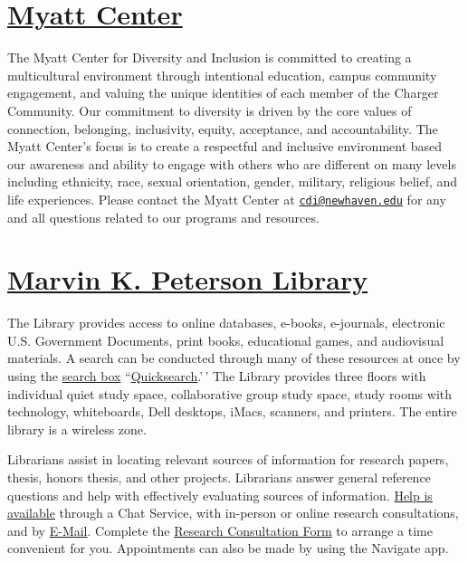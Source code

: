\documentclass[11pt,]{article}
\begin{document}
\hypertarget{myatt-center}{%
\section{\texorpdfstring{\href{https://mycharger.newhaven.edu/web/mycharger/center-for-diversity-and-inclusion}{Myatt
Center}}{Myatt Center}}\label{myatt-center}}

The Myatt Center for Diversity and Inclusion is committed to creating a
multicultural environment through intentional education, campus
community engagement, and valuing the unique identities of each member
of the Charger Community. Our commitment to diversity is driven by the
core values of connection, belonging, inclusivity, equity, acceptance,
and accountability. The Myatt Center's focus is to create a respectful
and inclusive environment based our awareness and ability to engage with
others who are different on many levels including ethnicity, race,
sexual orientation, gender, military, religious belief, and life
experiences. Please contact the Myatt Center at
\href{mailto:cdi@newhaven.edu}{\nolinkurl{cdi@newhaven.edu}} for any and
all questions related to our programs and resources.

\hypertarget{marvin-k.-peterson-library}{%
\section{\texorpdfstring{\href{https://mycharger.newhaven.edu/web/mycharger/library}{Marvin
K. Peterson
Library}}{Marvin K. Peterson Library}}\label{marvin-k.-peterson-library}}

The Library provides access to online databases, e-books, e-journals,
electronic U.S. Government Documents, print books, educational games,
and audiovisual materials. A search can be conducted through many of
these resources at once by using the
\href{https://mycharger.newhaven.edu/web/mycharger/library}{search box}
``\href{https://mycharger.newhaven.edu/web/mycharger/library}{Quicksearch}.'\,'
The Library provides three floors with individual quiet study space,
collaborative group study space, study rooms with technology,
whiteboards, Dell desktops, iMacs, scanners, and printers. The entire
library is a wireless zone.

Librarians assist in locating relevant sources of information for
research papers, thesis, honors thesis, and other projects. Librarians
answer general reference questions and help with effectively evaluating
sources of information.
\href{https://mycharger.newhaven.edu/web/mycharger/ask-a-librarian}{Help
is available} through a Chat Service, with in-person or online research
consultations, and by \href{mailto:LibraryHelp@newhaven.edu}{E-Mail}.
Complete the \href{mailto:LibraryHelp@newhaven.edu}{Research
Consultation Form} to arrange a time convenient for you. Appointments
can also be made by using the Navigate app.
\end{document}
